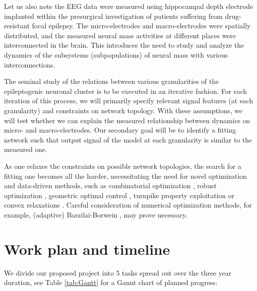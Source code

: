 \documentclass[a4paper,11pt]{scrartcl}
\begin{document}
Let us also note the \ac{EEG} data \cite{Brazdil2017} were measured using hippocampal depth electrode implanted within the presurgical investigation of patients suffering from drug-resistant focal epilepsy. The micro-electrodes and macro-electrodes were spatially distributed, and the measured neural mass activities at different places were interconnected in the brain. This introduces the need to study and analyze the dynamics of the subsystems (subpopulations) of neural mass with various interconnections.

The seminal study of the relations between various granularities of the epileptogenic neuronal cluster is to be executed in an iterative fashion. For each iteration of this process, we will primarily specify relevant signal features (at each granularity) and constraints on network topology. With these assumptions, we will test whether we can explain the measured relationship between dynamics on micro- and macro-electrodes. Our secondary goal will be to identify a fitting network such that output signal of the model at each granularity is similar to the measured one.

As one relaxes the constraints on possible network topologies, the search for a fitting one becomes all the harder, necessitating the need for novel optimization and data-driven methods, such as combinatorial optimization \cite{Dai2011}, robust optimization \cite{Ben-Tal2009}, geometric optimal control \cite{Agrachev2004}, turnpike property exploitation \cite{Gugat2024} or convex relaxations \cite{Eltved2021}. Careful consideration of numerical optimization methods, for example, (adaptive) Barzilai-Borwein \cite{Zhou2024}, may prove necessary.

\section{Work plan and timeline}\label{sec:workplan}


We divide our proposed project into 5 tasks spread out over the three year duration, see Table \ref{tab:Gantt} for a Gannt chart of planned progress:
\end{document}
